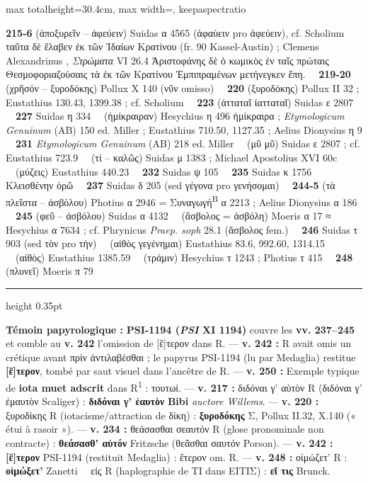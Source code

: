 \documentclass[11pt,twoside]{book}
\newcommand{\italique}[1]{\textit{#1}}
\newcommand{\expo}[1]{\textsuperscript{#1}}
\newcommand{\Run}{R\expo{1}}
\newcommand{\PsiUn}{PSI-1194}
\newcommand{\SynB}{Συναγωγή\expo{B} }
\newcommand{\ClemAlex}{Clemens Alexandrinus }
\newcommand{\Eustathe}{Eustathius }
\newcommand{\AelDion}{Aelius Dionysius }
\newcommand{\EtymGen}{\textit{Etymologicum Genuinum} }
\newcommand{\Apostol}{Michael Apostolius }
\newcommand{\lecon}[1]{\textbf{#1}}
\newcommand{\espApp}{\ {\color{ruleGold}{\policeFr ∥}}\ }
\newcommand{\espTest}{\ {\color{ruleGold}{\policeFr ∥}}\ }
\begin{document}
\begin{adjustbox}{max totalheight=30.4cm, max width=\textwidth, keepaspectratio}
\begin{minipage}{\textwidth}
{ \textbf{215-6} (ἀποξυρεῖν -- ἀφεύειν) Suidas α 4565 (ἀφαύειν pro ἀφεύειν), cf. Scholium ταῦτα δὲ ἔλαβεν ἐκ τῶν Ἰδαίων Κρατίνου (fr. 90 Kassel-Austin) ; \ClemAlex, \italique{Στρώματα} VI 26.4 Ἀριστοφάνης δὲ ὁ κωμικὸς ἐν ταῖς πρώταις Θεσμοφοριαζούσαις τὰ ἐκ τῶν Κρατίνου Ἐμπιπραμένων μετήνεγκεν ἔπη. \espTest \textbf{219-20} (χρῆσόν -- ξυροδόκης) Pollux X 140 (νῦν omisso) \espTest \textbf{220} (ξυροδόκης) Pollux II 32 ; \Eustathe 130.43, 1399.38 ; cf. Scholium \espTest \textbf{223} (ἀτταταῖ ἰατταταῖ) Suidas ε 2807 \espTest \textbf{227} Suidas η 334 \espTest (ἡμίκραιραν) Hesychius η 496 ἡμίκραιρα ; \EtymGen (AB) 150 ed. Miller ; \Eustathe 710.50, 1127.35 ; \AelDion η 9 \espTest \textbf{231} \EtymGen (AB) 218 ed. Miller \espTest (μῦ μῦ) Suidas ε 2807 ; cf. \Eustathe 723.9 \espTest (τί -- καλῶς) Suidas μ 1383 ; \Apostol XVI 60c \espTest (μύζεις) \Eustathe 440.23 \espTest \textbf{232} Suidas ψ 105 \espTest \textbf{235} Suidas κ 1756 Κλεισθένην ὁρῶ \espTest \textbf{237} Suidas δ 205 (sed γέγονα pro γενήσομαι) \espTest \textbf{244-5} (τὰ πλεῖστα -- ἀσβόλου) Photius α 2946 = \SynB α 2213 ; \AelDion α 186 \espTest \textbf{245} (φεῦ -- ἀσβόλου) Suidas α 4132 \espTest (ἄσβολος = ἀσβόλη) Moeris α 17 {\policeFr ≈} Hesychius α 7634 ; cf. Phrynicus \italique{Praep. soph} 28.1 (ἄσβολος fem.) \espTest \textbf{246} Suidas τ 903 (sed τὸν pro τὴν) \espTest (αἰθὸς γεγένημαι) \Eustathe 83.6, 992.60, 1314.15 \espTest (αἰθὸς) \Eustathe 1385.59 \espTest (τράμιν) Hesychius τ 1243 ; Photius τ 415 \espTest \textbf{248} (πλυνεῖ) Moeris π 79\par\vspace{2.5pt}
{\color{ruleGold}\hrule height 0.35pt}\vspace{2.5pt}
 \textbf{Témoin papyrologique :} \textbf{\PsiUn{} (\italique{PSI} XI 1194)} couvre les \textbf{vv. 237–245} et comble au \textbf{v. 242} l'omission de [ἓ]τερον dans R. --- \textbf{v. 242 :} R avait omis un crétique avant πρὶν ἀντιλαβέσθαι ; le papyrus \PsiUn{} (lu par Medaglia) restitue \lecon{[ἓ]τερον}, tombé par saut visuel dans l'ancêtre de R. --- \textbf{v. 250 :} Exemple typique de \textbf{iota muet adscrit} dans \Run{} : τουτωί. --- \textbf{v. 217 :} διδόναι γ' αὐτὸν R (διδόναι γ' ἐμαυτὸν Scaliger) : \lecon{διδόναι γ' ἑαυτὸν} \lecon{Bibi} \italique{auctore Willems}. --- \textbf{v. 220 :} ξυροδίκης R (iotacisme/attraction de δίκη) : \lecon{ξυροδόκης} {\policeGr Σ}, Pollux II.32, X.140 (« étui à rasoir »). --- \textbf{v. 234 :} θεάσασθαι σεαυτόν R (glose pronominale non contracte) : \lecon{θεάσασθ' αὑτόν} Fritzsche (θεᾶσθαι σαυτόν Porson). --- \textbf{v. 242 :} \lecon{[ἓ]τερον} \PsiUn{} (restituit Medaglia) : ἕτερον om. R. --- \textbf{v. 248 :} οἰμώζετ' R : \lecon{οἰμώξετ'} Zanetti \espApp εἰς R (haplographie de ΤΙ dans ΕΙΤΙΣ) : \lecon{εἴ τις} Brunck.\par}
\end{minipage}\end{adjustbox}
\end{document}
